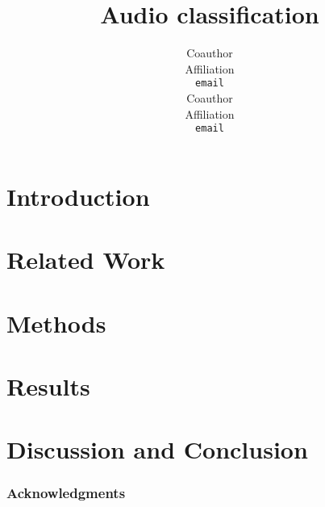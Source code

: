\documentclass{article} %
\title{Audio classification}
\author{
Coauthor\\
Affiliation\\
\texttt{email} \\
\And
Coauthor \\
Affiliation \\
\texttt{email} \\
}
\begin{document}
\maketitle

\begin{abstract}

\end{abstract}

\section{Introduction}

\blindtext

\section{Related Work}



\section{Methods}



\section{Results}



\section{Discussion and Conclusion}



\subsubsection*{Acknowledgments}




\end{document}
